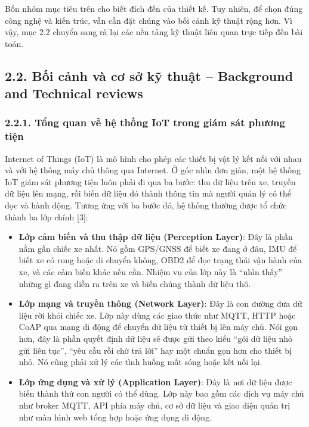 \documentclass[a4paper]{extarticle}
\providecommand{\tightlist}{%
  \setlength{\itemsep}{0pt}\setlength{\parskip}{0pt}}
\begin{document}
Bốn nhóm mục tiêu trên cho biết đích đến của thiết kế. Tuy nhiên, để
chọn đúng công nghệ và kiến trúc, vẫn cần đặt chúng vào bối cảnh kỹ
thuật rộng hơn. Vì vậy, mục 2.2 chuyển sang rà lại các nền tảng kỹ thuật
liên quan trực tiếp đến bài toán.

\subsection{2.2. Bối cảnh và cơ sở kỹ thuật -- Background and Technical
reviews}\label{22-bux1ed1i-cux1ea3nh-vuxe0-cux1a1-sux1edf-kux1ef9-thuux1eadt--background-and-technical-reviews}

\subsubsection{2.2.1. Tổng quan về hệ thống IoT trong giám sát phương
tiện}\label{221-tux1ed5ng-quan-vux1ec1-hux1ec7-thux1ed1ng-iot-trong-giuxe1m-suxe1t-phux1b0ux1a1ng-tiux1ec7n}

Internet of Things (IoT) là mô hình cho phép các thiết bị vật lý kết nối
với nhau và với hệ thống máy chủ thông qua Internet. Ở góc nhìn đơn giản,
một hệ thống IoT giám sát phương tiện luôn phải đi qua ba bước: thu dữ
liệu trên xe, truyền dữ liệu lên mạng, rồi biến dữ liệu đó thành thông
tin mà người quản lý có thể đọc và hành động. Tương ứng với ba bước đó,
hệ thống thường được tổ chức thành ba lớp chính {[}3{]}:

\begin{itemize}
\tightlist
\item
  \textbf{Lớp cảm biến và thu thập dữ liệu (Perception Layer)}: Đây là
  phần nằm gần chiếc xe nhất. Nó gồm GPS/GNSS để biết xe đang ở đâu, IMU
  để biết xe có rung hoặc di chuyển không, OBD2 để đọc trạng thái vận
  hành của xe, và các cảm biến khác nếu cần. Nhiệm vụ của lớp này là
  ``nhìn thấy'' những gì đang diễn ra trên xe và biến chúng thành dữ
  liệu thô.
\item
  \textbf{Lớp mạng và truyền thông (Network Layer)}: Đây là con đường
  đưa dữ liệu rời khỏi chiếc xe. Lớp này dùng các giao thức như MQTT,
  HTTP hoặc CoAP qua mạng di động để chuyển dữ liệu từ thiết bị lên máy
  chủ. Nói gọn hơn, đây là phần quyết định dữ liệu sẽ được gửi theo kiểu
  ``gói dữ liệu nhỏ gửi liên tục'', ``yêu cầu rồi chờ trả lời'' hay một chuẩn
  gọn hơn cho thiết bị nhỏ. Nó cũng phải xử lý các tình huống mất sóng
  hoặc kết nối lại.
\item
  \textbf{Lớp ứng dụng và xử lý (Application Layer)}: Đây là nơi dữ liệu
  được biến thành thứ con người có thể dùng. Lớp này bao gồm các dịch vụ
  máy chủ như broker MQTT, API phía máy chủ, cơ sở dữ liệu và giao diện
  quản trị như màn hình web tổng hợp hoặc ứng dụng di động.
\end{itemize}
\end{document}
